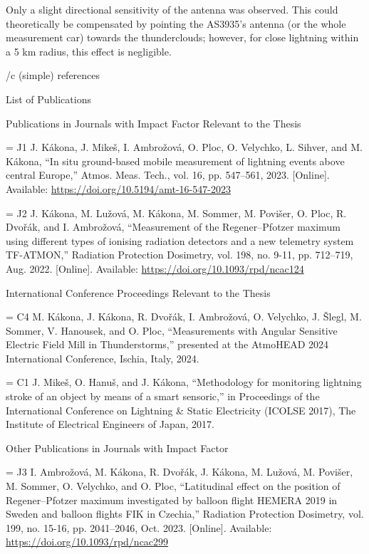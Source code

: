 Only a slight directional sensitivity of the antenna was observed. This could theoretically be compensated by pointing the AS3935’s antenna (or the whole measurement car) towards the thunderclouds; however, for close lightning within a 5 km radius, this effect is negligible.

\bibchap

\usebib/c (simple) references

\app List of Publications

\specialbibs


\secc Publications in Journals with Impact Factor Relevant to the Thesis

\bib[j1] = {J1} J. Kákona, J. Mikeš, I. Ambrožová, O. Ploc, O. Velychko, L. Sihver, and M. Kákona, “In situ ground-based mobile measurement of lightning events above central Europe,” Atmos. Meas. Tech., vol. 16, pp. 547–561, 2023. [Online]. Available: \url{https://doi.org/10.5194/amt-16-547-2023}

\bib[j2] = {J2} J. Kákona, M. Lužová, M. Kákona, M. Sommer, M. Povišer, O. Ploc, R. Dvořák, and I. Ambrožová, “Measurement of the Regener–Pfotzer maximum using different types of ionising radiation detectors and a new telemetry system TF-ATMON,” Radiation Protection Dosimetry, vol. 198, no. 9-11, pp. 712–719, Aug. 2022. [Online]. Available: \url{https://doi.org/10.1093/rpd/ncac124}

\secc International Conference Proceedings Relevant to the Thesis

\bib[c4] = {C4} M. Kákona, J. Kákona, R. Dvořák, I. Ambrožová, O. Velychko, J. Šlegl, M. Sommer, V. Hanousek, and O. Ploc, “Measurements with Angular Sensitive Electric Field Mill in Thunderstorms,” presented at the AtmoHEAD 2024 International Conference, Ischia, Italy, 2024.

\bib[c1] = {C1} J. Mikeš, O. Hanuš, and J. Kákona, “Methodology for monitoring lightning stroke of an object by means of a smart sensoric,” in Proceedings of the International Conference on Lightning \& Static Electricity (ICOLSE 2017), The Institute of Electrical Engineers of Japan, 2017.

\secc Other Publications in Journals with Impact Factor

\bib[j3] = {J3} I. Ambrožová, M. Kákona, R. Dvořák, J. Kákona, M. Lužová, M. Povišer, M. Sommer, O. Velychko, and O. Ploc, “Latitudinal effect on the position of Regener–Pfotzer maximum investigated by balloon flight HEMERA 2019 in Sweden and balloon flights FIK in Czechia,” Radiation Protection Dosimetry, vol. 199, no. 15-16, pp. 2041–2046, Oct. 2023. [Online]. Available: \url{https://doi.org/10.1093/rpd/ncac299}

